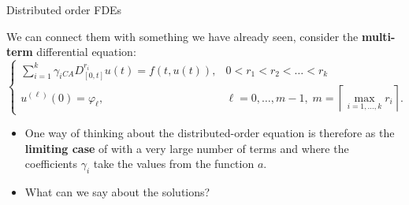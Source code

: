 \documentclass[aspectratio=169,xcolor=dvipsnames]{beamer}
\begin{document}
\begin{frame}{Distributed order FDEs}

We can connect them with something we have already seen, consider the \textbf{multi-term} differential equation:
\[
\begin{cases}
\displaystyle \sum_{i=1}^{k} \gamma_i {}_{CA} D^{r_i}_{[0,t]} u(t) = f(t,u(t)), & 0 < r_1 < r_2 < \ldots < r_k \\
u^{(\ell)}(0) = \varphi_\ell, & \ell = 0,\ldots,m-1, \; \displaystyle m = \left\lceil \max_{i=1,\ldots,k} r_i \right\rceil.
\end{cases}
\]
\begin{itemize}
	\item[\faLightbulb] One way of thinking about the distributed-order equation is therefore as the \textbf{limiting case} of with a very 
	large number of terms and where the \alert{coefficients $\gamma_i$ take the values from the function $a$}. 
	\item[\faQuestionCircle]<2-> What can we say about the solutions?
\end{itemize}

\end{frame}
\end{document}
